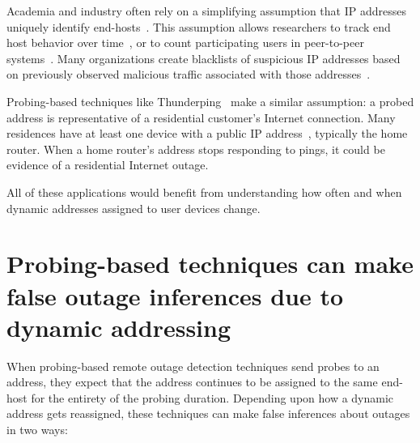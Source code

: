 Academia and industry often rely on a simplifying assumption that IP
addresses uniquely identify
end-hosts~\cite{p2pfilesharing,p2pavail,sen2004analyzing,sekar2006multi,anomalousdns,kuhrer2015going,xie2005worm,jung2004empirical,fabian2007botnet,stone2009your,andriesse2015reliable,fail2ban,spamhaus,cbl,sorbs}. This
assumption allows researchers to track end host behavior over
time~\cite{anomalousdns, kuhrer2015going, pingin}, or to count
participating users in peer-to-peer
systems~\cite{p2pfilesharing,p2pavail,sen2004analyzing}. Many
organizations create blacklists of suspicious IP addresses based on
previously observed malicious traffic associated with those
addresses~\cite{fail2ban,spamhaus,cbl,sorbs}. 

Probing-based techniques like Thunderping~\cite{pingin} make a similar
assumption: a probed address is representative of a residential
customer's Internet connection. Many residences have at least one
device with a public IP address~\cite{cgn-imc16}, typically the home
router. When a home router's address stops responding
to pings, it could be evidence of a residential Internet outage.

All of these applications would benefit from understanding how often
and when dynamic addresses assigned to user devices change.

\section{Probing-based techniques can make false outage inferences due
to dynamic addressing}

\label{sec:addrchange-false-inferences}

When probing-based remote outage detection techniques send probes to an address, they expect that the
address continues to be assigned to the same end-host for the entirety
of the probing duration. Depending upon how a dynamic address gets
reassigned, these techniques can make false inferences about outages in two ways:

